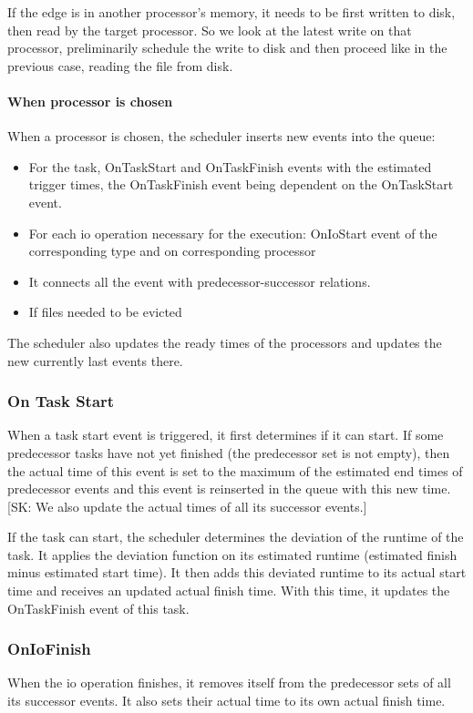 \documentclass[conference]{IEEEtran}
\newcommand{\skug}[1]{{\color{blue}[SK: #1]}}
\begin{document}
     If the edge is in another processor's memory, it needs to be first written to disk, then read by the target processor.
    So we look at the latest write on that processor, preliminarily schedule the write to disk and then proceed like in the
    previous case, reading the file from disk.

   \paragraph{When processor is chosen} When a processor is chosen, the scheduler inserts new events into the queue:
    \begin{itemize}
        \item For the task, OnTaskStart and OnTaskFinish events with the estimated trigger times, the OnTaskFinish event being dependent on the OnTaskStart event.
        \item For each io operation necessary for the execution: OnIoStart event of the corresponding type and on corresponding processor
        \item It connects all the event with predecessor-successor relations.
        \item If files needed to be evicted
    \end{itemize}
    The scheduler also updates the ready times of the processors and updates the new currently last events there.

    \subsubsection{On Task Start}
    When a task start event is triggered, it first determines if it can start.
    If some predecessor tasks have not yet finished (the predecessor set is not empty), then the actual time of this event
    is set to the maximum of the estimated end times of predecessor events and this event is reinserted in the queue
    with this new time.
    \skug{We  also update the actual times of all its successor events.}

    If the task can start, the scheduler determines the deviation of the runtime of the task.
    It applies the deviation function on its estimated runtime (estimated finish minus estimated start time).
    It then adds this deviated runtime to its actual start time and receives an updated actual finish time.
    With this time, it updates the OnTaskFinish event of this task.

    \subsubsection{OnIoFinish}
    When the io operation finishes, it removes itself from the predecessor sets of all its successor events.
    It also sets their actual time to its own actual finish time.
\end{document}
